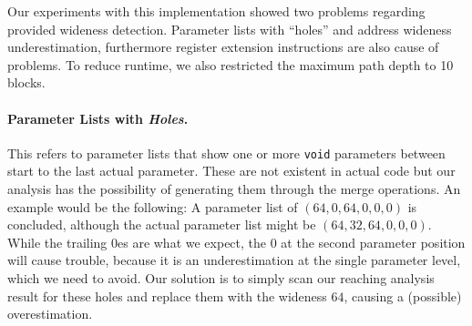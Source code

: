 %
%
%

Our experiments with this implementation showed two problems regarding provided wideness detection.  Parameter lists with ``holes'' and address wideness underestimation, 
furthermore register extension instructions are also cause of problems. To reduce runtime, we also restricted the maximum path depth to 10 blocks.

\paragraph{Parameter Lists with \textit{Holes}.} This refers to parameter lists that show one or more \texttt{void} parameters between start to the last actual parameter. 
These are not existent in actual code but our analysis has the possibility of generating them through the merge operations. An example would be the following: 
A parameter list of $(64, 0, 64, 0, 0, 0)$ is concluded, although the actual parameter list might be $(64, 32, 64, 0, 0, 0)$. While the trailing 0es are 
what we expect, the 0 at the second parameter position will cause trouble, because it is an underestimation at the single parameter level, which we need to avoid.
Our solution is to simply scan our reaching analysis result for these holes and replace them with the wideness $64$, causing a (possible) overestimation.

